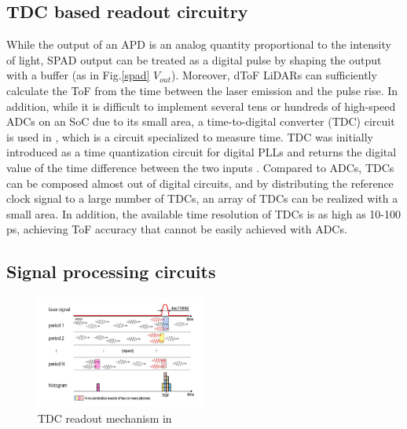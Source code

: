 \documentclass[paper]{ieice}
\begin{document}
\subsection{TDC based readout circuitry}
\qquad While the output of an APD is an analog quantity proportional to the intensity of light,  SPAD output can be treated as a digital pulse by shaping the output with a buffer (as in Fig.\ref{spad} $V_{out}$). Moreover, dToF LiDARs can sufficiently calculate the ToF from the time between the laser emission and the pulse rise. In addition, while it is difficult to implement several tens or hundreds of high-speed ADCs on an SoC due to its small area, a time-to-digital converter (TDC) circuit is used in \cite{niclass2012100}, which is a circuit specialized to measure time. TDC was initially introduced as a time quantization circuit for digital PLLs and returns the digital value of the time difference between the two inputs \cite{leetdc, elkholytdc}.
Compared to ADCs, TDCs can be composed almost out of digital circuits, and by distributing the reference clock signal to a large number of TDCs, an array of TDCs can be realized with a small area. In addition, the available time resolution of TDCs is as high as 10-100 ps, achieving ToF accuracy that cannot be easily achieved with ADCs.

\subsection{Signal processing circuits}
\begin{figure}[!t]
\centering
 \includegraphics[width=0.5\textwidth]{figs/threshold.png}
  \caption{TDC readout mechanism in \cite{niclass2012100}}
\label{tdc}
\end{figure}

\end{document}
